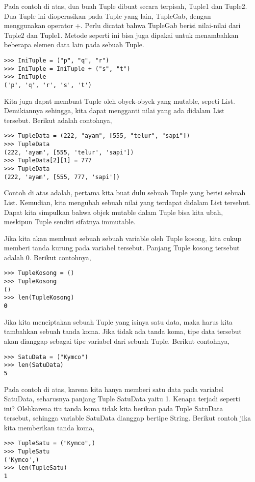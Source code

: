 Pada contoh di atas, dua buah Tuple dibuat secara terpisah, Tuple1 dan Tuple2. Dua Tuple ini dioperasikan pada Tuple yang lain, TupleGab, dengan menggunakan operator +. Perlu dicatat bahwa TupleGab berisi nilai-nilai dari Tuple2 dan Tuple1. Metode seperti ini bisa juga dipakai untuk menambahkan beberapa elemen data lain pada sebuah Tuple.
\begin{verbatim}
>>> IniTuple = ("p", "q", "r")
>>> IniTuple = IniTuple + ("s", "t")
>>> IniTuple
('p', 'q', 'r', 's', 't')
\end{verbatim}

Kita juga dapat membuat Tuple oleh obyek-obyek yang mutable, sepeti List. Demikiannya sehingga, kita dapat mengganti nilai yang ada didalam List tersebut. Berikut adalah contohnya,
\begin{verbatim}
>>> TupleData = (222, "ayam", [555, "telur", "sapi"])
>>> TupleData
(222, 'ayam', [555, 'telur', 'sapi'])
>>> TupleData[2][1] = 777
>>> TupleData
(222, 'ayam', [555, 777, 'sapi'])
\end{verbatim}
Contoh di atas adalah, pertama kita buat dulu sebuah Tuple yang berisi sebuah List. Kemudian, kita mengubah sebuah nilai yang terdapat didalam List tersebut. Dapat kita simpulkan bahwa objek mutable dalam Tuple bisa kita ubah, meskipun Tuple sendiri sifatnya immutable.

Jika kita akan membuat sebuah sebuah variable oleh Tuple kosong, kita cukup memberi tanda kurung pada variabel tersebut. Panjang Tuple kosong tersebut adalah 0. Berikut contohnya,
\begin{verbatim}
>>> TupleKosong = ()
>>> TupleKosong
()
>>> len(TupleKosong)
0
\end{verbatim}
Jika kita menciptakan sebuah Tuple yang isinya satu data, maka harus kita tambahkan sebuah tanda koma. Jika tidak ada tanda koma, tipe data tersebut akan dianggap sebagai tipe variabel dari sebuah Tuple. Berikut contohnya,
\begin{verbatim}
>>> SatuData = ("Kymco")
>>> len(SatuData)
5
\end{verbatim}
Pada contoh di atas, karena kita hanya memberi satu data pada variabel SatuData, seharusnya panjang Tuple SatuData yaitu 1. Kenapa terjadi seperti ini? Olehkarena itu tanda koma tidak kita berikan pada Tuple SatuData tersebut, sehingga variable SatuData dianggap bertipe String. Berikut contoh jika kita memberikan tanda koma,
\begin{verbatim}
>>> TupleSatu = ("Kymco",)
>>> TupleSatu
('Kymco',)
>>> len(TupleSatu)
1
\end{verbatim}


